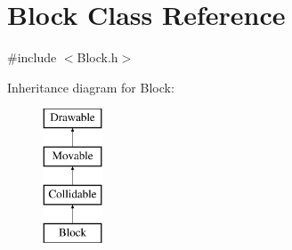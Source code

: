 \hypertarget{class_block}{\section{Block Class Reference}
\label{class_block}
}


{\ttfamily \#include $<$Block.\-h$>$}

Inheritance diagram for Block\-:\begin{figure}[H]
\begin{center}
\leavevmode
\includegraphics[height=4.000000cm]{class_block}
\end{center}
\end{figure}
